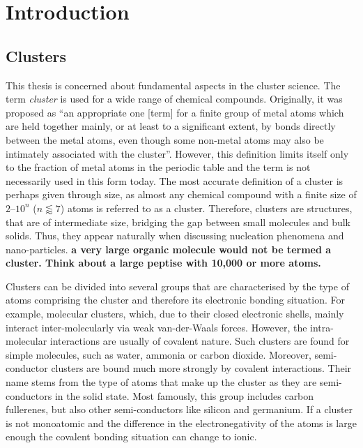 
\part{Introduction}
\label{sec:introduction}

%
\chapter{Clusters}
\label{sec:clusters}

This thesis is concerned about fundamental aspects in the cluster science.
The term \emph{cluster} is used for a wide range of chemical compounds.
Originally, it was proposed as ``an appropriate one [term] for a finite group of
metal atoms which are held together mainly, or at least to a significant extent,
by bonds directly between the metal atoms, even though some non-metal atoms may
also be intimately associated with the
cluster''.\autocite{Cotton_MetalAtomClusters_1964} However, this definition
limits itself only to the fraction of metal atoms in the periodic table and the
term is not necessarily used in this form today. The most accurate definition of
a cluster is perhaps given through size, as almost any chemical compound with a
finite size of $2$--$10^n$ ($n\lessapprox 7$) atoms is referred to as a
cluster.\autocite{Johnston_Atomicmolecularclusters_2002,Wales_Energylandscapes_2003}
Therefore, clusters are structures, that are of intermediate size, bridging the
gap between small molecules and bulk solids. Thus, they appear naturally when
discussing nucleation phenomena and nano-particles. {\bf a very large organic
molecule would not be termed a cluster. Think about a large peptise with 10,000 or more atoms.}

Clusters can be divided into several groups that are characterised by the type
of atoms comprising the cluster and therefore its electronic bonding situation.
For example, molecular clusters, which, due to their closed electronic shells,
mainly interact inter-molecularly via weak van-der-Waals forces. However, the
intra-molecular interactions are usually of covalent nature. Such clusters are
found for simple molecules, such as water,\autocite{Liu_WaterClusters_1996}
ammonia\autocite{Beu_Structureammoniaclusters_2001} or carbon
dioxide.\autocite{Takeuchi_GeometryOptimizationCarbon_2008} Moreover,
semi-conductor clusters are bound much more strongly by covalent interactions.
Their name stems from the type of atoms that make up the cluster as they are
semi-conductors in the solid state. Most famously, this group includes carbon
fullerenes\autocite{Kroto_stabilityfullerenesCn_1987}, but also other
semi-conductors like silicon\autocite{Zhu_Structuresstabilitiessmall_2003a} and
germanium.\autocite{Pacchioni_Silicongermaniumclusters_1986} If a cluster is not
monoatomic and the difference in the electronegativity of the atoms is large
enough the covalent bonding situation can change to ionic.

